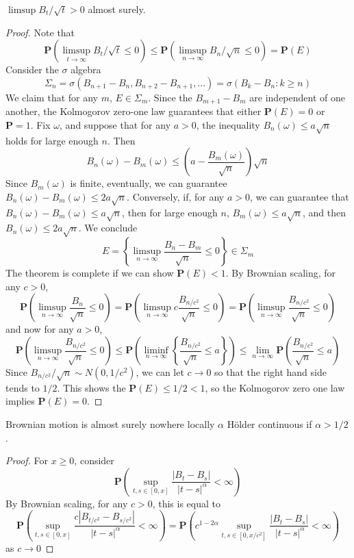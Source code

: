\begin{theorem}
    $\limsup B_t/\sqrt{t} > 0$ almost surely.
\end{theorem}
\begin{proof}
    Note that
    \[ \mathbf{P} \left( \limsup_{t \to \infty} B_t/\sqrt{t} \leq 0 \right) \leq \mathbf{P} \left( \limsup_{n \to \infty} B_n/\sqrt{n} \leq 0 \right) = \mathbf{P}(E) \]
    Consider the $\sigma$ algebra
    \[ \Sigma_n = \sigma(B_{n+1} - B_n, B_{n+2} - B_{n+1}, \dots) = \sigma(B_k - B_n : k \geq n) \]
    We claim that for any $m$, $E \in \Sigma_m$. Since the $B_{m+1} - B_m$ are independent of one another, the Kolmogorov zero-one law guarantees that either $\mathbf{P}(E) = 0$ or $\mathbf{P} = 1$. Fix $\omega$, and suppose that for any $a > 0$, the inequality $B_n(\omega) \leq a \sqrt{n}$ holds for large enough $n$. Then
    \[ B_n(\omega) - B_m(\omega) \leq \left( a - \frac{B_m(\omega)}{\sqrt{n}} \right) \sqrt{n} \]
    Since $B_m(\omega)$ is finite, eventually, we can guarantee $B_n(\omega) - B_m(\omega) \leq 2a\sqrt{n}$. Conversely, if, for any $a > 0$, we can guarantee that $B_n(\omega) - B_m(\omega) \leq a\sqrt{n}$, then for large enough $n$, $B_m(\omega) \leq a \sqrt{n}$, and then $B_n(\omega) \leq 2a \sqrt{n}$. We conclude
    \[ E = \left\{ \limsup_{n \to \infty} \frac{B_n - B_m}{\sqrt{n}} \leq 0 \right\} \in \Sigma_m \]
    The theorem is complete if we can show $\mathbf{P}(E) < 1$. By Brownian scaling, for any $c > 0$,
    \[ \mathbf{P} \left( \limsup_{n \to \infty} \frac{B_n}{\sqrt{n}} \leq 0 \right) = \mathbf{P} \left( \limsup_{n \to \infty} c \frac{B_{n/c^2}}{\sqrt{n}} \leq 0 \right) = \mathbf{P}\left( \limsup_{n \to \infty} \frac{B_{n/c^2}}{\sqrt{n}} \leq 0 \right) \]
    and now for any $a > 0$,
    \[ \mathbf{P}\left( \limsup_{n \to \infty} \frac{B_{n/c^2}}{\sqrt{n}} \leq 0 \right) \leq \mathbf{P} \left( \liminf_{n \to \infty} \left\{ \frac{B_{n/c^2}}{\sqrt{n}} \leq a \right\} \right) \leq \lim_{n \to \infty} \mathbf{P} \left( \frac{B_{n/c^2}}{\sqrt{n}} \leq a \right) \]
    Since $B_{n/c^2}/\sqrt{n} \sim N(0,1/c^2)$, we can let $c \to 0$ so that the right hand side tends to $1/2$. This shows the $\mathbf{P}(E) \leq 1/2 < 1$, so the Kolmogorov zero one law implies $\mathbf{P}(E) = 0$.
\end{proof}

\begin{corollary}
    Brownian motion is almost surely nowhere locally $\alpha$ H\"{o}lder continuous if $\alpha > 1/2$.
\end{corollary}
\begin{proof}
    For $x \geq 0$, consider
    \[ \mathbf{P} \left( \sup_{t,s \in [0,x]} \frac{|B_t - B_s|}{\ |t - s|^\alpha} < \infty \right) \]
    By Brownian scaling, for any $c > 0$, this is equal to
    \[ \mathbf{P} \left( \sup_{t,s \in [0,x]} \frac{c |B_{t/c^2} - B_{s/c^2}|}{\ |t - s|^\alpha} < \infty \right) = \mathbf{P} \left( c^{1-2\alpha} \sup_{t,s \in [0,x/c^2]} \frac{|B_t - B_s|}{\ |t - s|^\alpha} < \infty \right) \]
    as $c \to 0$
\end{proof}

